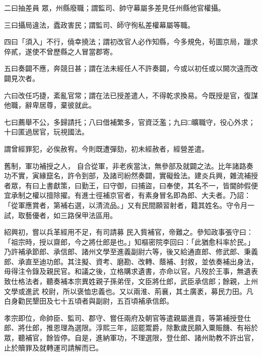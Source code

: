 \begin{pinyinscope}
 二曰抽差員
 眾，州縣廢職；謂監司、帥守幕屬多差見任州縣他官權攝。



 三曰攝局違法，蠹政害民；謂監司、師守徇私差權幕屬等職。



 四曰「須入」不行，僥幸撓法；謂初改官人必作知縣，今多規免，茍圖京局，躐求倅貳，遂使不曾歷縣之人冒當郡寄。



 五曰奏闢不應，奔競日甚；謂在法未經任人不許奏闢，今或以初任或以闕次遠而改闢見次者。



 六曰改任巧捷，紊亂官常；謂在法已授差遣人，不得乾求換易。今既授是官，復謀他職，辭卑居尊，棄彼就此。



 七曰薦舉不公，多歸請托；八曰借補繁多，官資泛濫；九曰□曠職守，役心外求；十曰匿過居官，玩視國法。



 謂曾經罪犯，必俟赦宥。今則既遭彈劾，初未經赦者，經營差遣。



 舊制，軍功補授之人，
 自合從軍，非老疾當汰，無參部及就闢之法。比年諸路奏功不實，寅緣竄名，許令到部，及諸司紛然奏闢，實礙銓法。建炎兵興，雜流補授者眾，有曰上書獻策，曰勤王，曰守御，曰捕盜，曰奉使，其名不一，皆閫帥假便宜承制之權以擅除擢。有進士徑補京官者，有素身冒名即為郎、大夫者。乃詔：「從軍應賞者，第補右選，以清流品。」又有民間願習射者，籍其姓名。守令月一試，取藝優者，如三路保甲法區用。



 紹興初，嘗以兵革經用不足，有司請募
 民入貲補官，帝難之。參知政事張守曰：「祖宗時，授以齋郎，今之將仕郎是也。」知樞密院李回曰：「此猶愈科率於民。」乃許補承節郎、承信郎、諸州文學至進義副尉六等，後又給通直郎、修武郎、秉義郎、承直至迪功郎。其注擬、資考、磨勘、改轉、蔭補、封敘，並依奏補出身法，毋得注令錄及親民官。和議之後，立格購求遺書，亦命以官。凡歿於王事，無遺表致仕格法者，聽奏補本宗異姓親子孫弟侄，文臣將仕郎，武臣承信郎；餘親，上州文學或進武
 校尉，所以褒恤忠義也。又以兩淮、荊襄，其土廣袤，募民力田。凡白身勸民墾田及七十五頃者與副尉，五百頃補承信郎。



 孝宗即位，命帥臣、監司、郡守、嘗任兩府及朝官等遣親屬進貢，等第補授登仕郎、將仕郎，推恩理為選限。淳熙三年，詔罷鬻爵，除歉歲民願入粟賑饑、有裕於眾，聽補官，餘皆停。自是，進納軍功，不理選限，登仕郎、諸州助教不許出官，止於贖罪及就轉運司請解而已。



\end{pinyinscope}